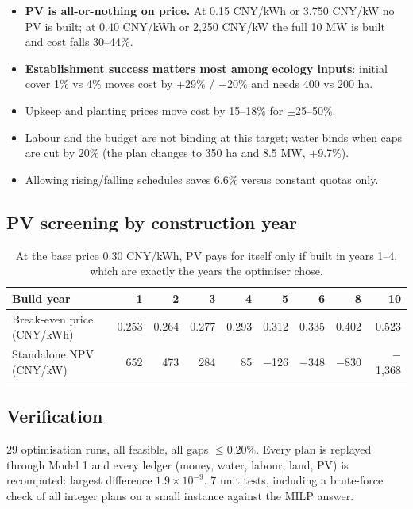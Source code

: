 \documentclass[11pt,a4paper]{article}
\begin{document}
\begin{itemize}
\item \textbf{PV is all-or-nothing on price.} At 0.15 CNY/kWh or 3,750 CNY/kW no PV is built; at 0.40 CNY/kWh or 2,250 CNY/kW the full 10 MW is built and cost falls 30--44\%.
\item \textbf{Establishment success matters most among ecology inputs}: initial cover 1\% vs 4\% moves cost by +29\% / $-$20\% and needs 400 vs 200 ha.
\item Upkeep and planting prices move cost by 15--18\% for $\pm$25--50\%.
\item Labour and the budget are not binding at this target; water binds when caps are cut by 20\% (the plan changes to 350 ha and 8.5 MW, +9.7\%).
\item Allowing rising/falling schedules saves 6.6\% versus constant quotas only.
\end{itemize}

\subsection{PV screening by construction year}
\begin{table}[H]\centering\small
\begin{tabular}{@{}lrrrrrrrr@{}}
\toprule
Build year & 1 & 2 & 3 & 4 & 5 & 6 & 8 & 10\\
\midrule
Break-even price (CNY/kWh) & 0.253 & 0.264 & 0.277 & 0.293 & 0.312 & 0.335 & 0.402 & 0.523\\
Standalone NPV (CNY/kW) & 652 & 473 & 284 & 85 & $-$126 & $-$348 & $-$830 & $-$1,368\\
\bottomrule
\end{tabular}
\caption{At the base price 0.30 CNY/kWh, PV pays for itself only if built in years 1--4, which are exactly the years the optimiser chose.}
\label{tab:pv}
\end{table}

\subsection{Verification}
29 optimisation runs, all feasible, all gaps $\le0.20\%$. Every plan is replayed through Model 1 and every
ledger (money, water, labour, land, PV) is recomputed: largest difference $1.9\times10^{-9}$.
7 unit tests, including a brute-force check of all integer plans on a small instance against the MILP answer.

\end{document}
